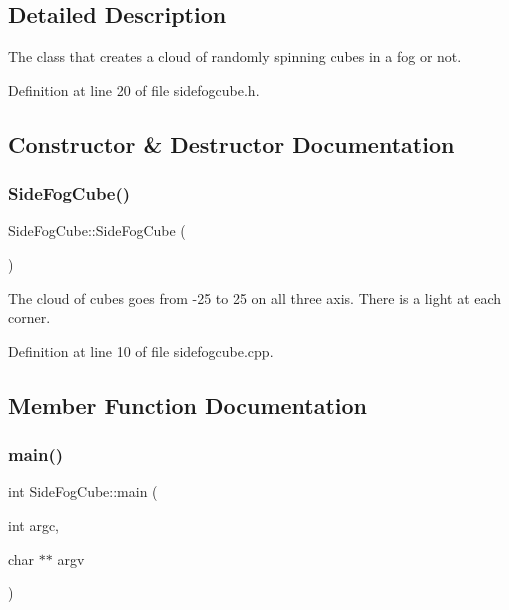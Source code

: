 \subsection{Detailed Description}
The class that creates a cloud of randomly spinning cubes in a fog or not. 

Definition at line 20 of file sidefogcube.\+h.



\subsection{Constructor \& Destructor Documentation}
\mbox{\label{classSideFogCube_af3f3ad8ae933d9275fb7b761c55d31fd}} 
\subsubsection{\texorpdfstring{Side\+Fog\+Cube()}{SideFogCube()}}
{\footnotesize\ttfamily Side\+Fog\+Cube\+::\+Side\+Fog\+Cube (\begin{DoxyParamCaption}{ }\end{DoxyParamCaption})}

The cloud of cubes goes from -\/25 to 25 on all three axis. There is a light at each corner.

Definition at line 10 of file sidefogcube.\+cpp.



\subsection{Member Function Documentation}
\mbox{\label{classSideFogCube_a54448225b0c51ba310629e606d4f512d}} 
\subsubsection{\texorpdfstring{main()}{main()}}
{\footnotesize\ttfamily int Side\+Fog\+Cube\+::main (\begin{DoxyParamCaption}\item[{int}]{argc,  }\item[{char $\ast$$\ast$}]{argv }\end{DoxyParamCaption})\hspace{0.3cm}{\ttfamily [virtual]}}



